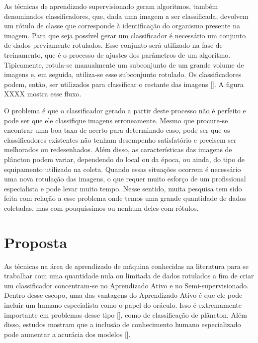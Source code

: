 As técnicas de aprendizado supervisionado geram algoritmos, também denominados classificadores, que, dada uma imagem a ser classificada, devolvem um rótulo de classe que corresponde à identificação do organismo presente na imagem. Para que seja possível gerar um classificador é necessário um conjunto de dados previamente rotulados. Esse conjunto será utilizado na fase de treinamento, que é o processo de ajustes dos parâmetros de um algoritmo. Tipicamente, rotula-se manualmente um subconjunto de um grande volume de imagens e, em seguida, utiliza-se esse subconjunto rotulado. Os classificadores podem, então, ser utilizados para classificar o restante das imagens [\cite{jeffries1980computer, jeffries1984automated, berman1990image, tang1998automatic}]. A figura XXXX mostra esse fluxo. 


O problema é que o classificador gerado a partir deste processo não é perfeito e pode ser que ele classifique imagens erroneamente. Mesmo que procure-se encontrar uma boa taxa de acerto para determinado caso, pode ser que os classificadores existentes não tenham desempenho satisfatório e precisem ser melhorados ou redesenhados. Além disso, as características das imagens de plâncton podem variar, dependendo do local ou da época, ou ainda, do tipo de equipamento utilizado na coleta. Quando essas situações ocorrem é necessário uma nova rotulação das imagens, o que requer muito esforço de um profissional especialista e pode levar muito tempo. Nesse sentido, muita pesquisa tem sido feita com relação a esse problema onde temos uma grande quantidade de dados coletadas, mas com pouquíssimos ou nenhum deles com rótulos. 



\section{Proposta}
\label{sec:intro_proposta}


As técnicas na área de aprendizado de máquina conhecidas na literatura para se trabalhar com uma quantidade nula ou limitada de dados rotulados a fim de criar um classificador concentram-se no Aprendizado Ativo e no Semi-supervisionado. Dentro desse escopo, uma das vantagens do Aprendizado Ativo é que ele pode incluir um humano especialista como o papel do oráculo. Isso é extremamente importante em problemas desse tipo [\cite{saito2014active}], como de classificação de plâncton. Além disso, estudos mostram que a inclusão de conhecimento humano especializado pode aumentar a acurácia dos modelos [\cite{benfield2007rapid}].

